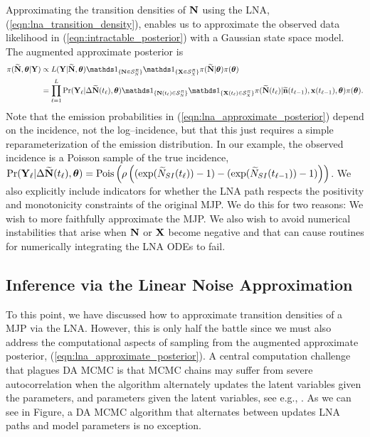 Approximating the transition densities of $ \mathbf{N} $ using the LNA, (\ref{eqn:lna_transition_density}), enables us to approximate the observed data likelihood in (\ref{eqn:intractable_posterior}) with a Gaussian state space model. The augmented approximate posterior is
\begin{align}
\label{eqn:lna_approximate_posterior}
\pi(\bNtil,\btheta|\bY) &\propto L(\bY|\bNtil,\btheta)\ind{\bN\in\mcS_N^R}\ind{\bX\in\mcS_X^R}\pi(\bNtil|\btheta)\pi(\btheta) \nonumber\\
&= \prod_{\ell=1}^{L}\Pr(\bY_\ell|\Delta\bNtil(t_\ell),\btheta)\ind{\bN(t_\ell)\in\mcS_N^R}\ind{\bX(t_\ell)\in\mcS_X^R}\pi(\bNtil(t_\ell)|\bntil(t_{\ell-1}),\bx(t_{\ell-1}),\btheta)\pi(\btheta).
\end{align}
Note that the emission probabilities in (\ref{eqn:lna_approximate_posterior}) depend on the incidence, not the log--incidence, but that this just requires a simple reparameterization of the emission distribution. In our example, the observed incidence is a Poisson sample of the true incidence, $ \Pr(\mathbf{Y}_\ell|\Delta\widetilde{\mathbf{N}}(t_\ell),\boldsymbol{\theta}) = \mathrm{Pois}\left (\rho\left ((\exp(\widetilde{N}_{SI}(t_\ell))-1) - (\exp(\widetilde{N}_{SI}(t_{\ell-1})) - 1)\right )\right ) $. We also explicitly include indicators for whether the LNA path respects the positivity and monotonicity constraints of the original MJP. We do this for two reasons: We wish to more faithfully approximate the MJP. We also wish to avoid numerical instabilities that arise when $ \mathbf{N} $ or $ \mathbf{X} $ become negative and that can cause routines for numerically integrating the LNA ODEs to fail. 

\subsection{Inference via the Linear Noise Approximation}
\label{subsec:lna_inference}

To this point, we have discussed how to approximate transition densities of a MJP via the LNA. However, this is only half the battle since we must also address the computational aspects of sampling from the augmented approximate posterior, (\ref{eqn:lna_approximate_posterior}). A central computation challenge that plagues DA MCMC is that MCMC chains may suffer from severe autocorrelation when the algorithm alternately updates the latent variables given the parameters, and parameters given the latent variables, see e.g., \cite{bernardo2003non,papaspiliopoulos2003noncentered,papaspiliopoulos2007general,yu2011center}. As we can see in Figure, a DA MCMC algorithm that alternates between updates LNA paths and model parameters is no exception.

